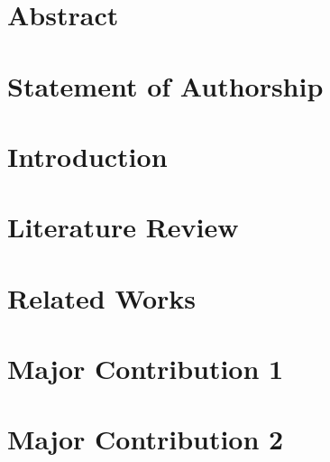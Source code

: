 \documentclass[twoside,openright,titlepage,numbers=noenddot,headinclude,footinclude=true,cleardoublepage=empty,listof=totoc,paper=a4,fontsize=11pt,australian,twoside=semi,DIV=calc]{scrreprt}
\begin{document}
  \frenchspacing
  \raggedbottom
  
  \pagestyle{plain}
  
  
  \singlespacing
  
  
  
  \onehalfspacing
  
  
  \chapter*{Abstract}
  
  
  \chapter*{Statement of Authorship}
  
  
  
  
  

  
  \cleardoublepage
  \pagestyle{scrheadings}
  \onehalfspacing
  
  \chapter{Introduction}\label{c:Introduction}
  
  
  \chapter{Literature Review}\label{c:Background}
  
  
  \chapter{Related Works}\label{c:Related-Works}
  
  
  \chapter{Major Contribution 1}\label{c:Contribution-1}
  
  
  \chapter{Major Contribution 2}\label{c:Contribution-2}
  
\end{document}
